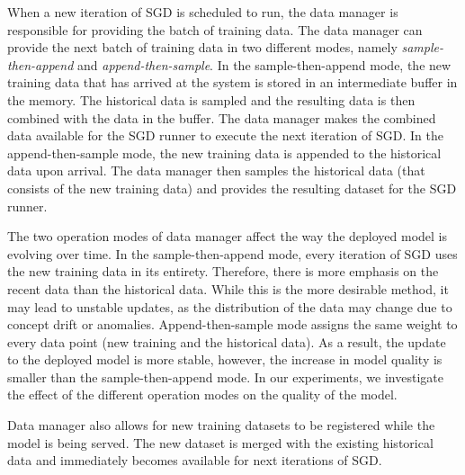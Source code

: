 When a new iteration of SGD is scheduled to run, the data manager is responsible for providing the batch of training data.
The data manager can provide the next batch of training data in two different modes, namely \textit{sample-then-append} and \textit{append-then-sample}.
In the sample-then-append mode, the new training data that has arrived at the system is stored in an intermediate buffer in the memory.
The historical data is sampled and the resulting data is then combined with the data in the buffer.
The data manager makes the combined data available for the SGD runner to execute the next iteration of SGD.
In the append-then-sample mode, the new training data is appended to the historical data upon arrival.
The data manager then samples the historical data (that consists of the new training data) and provides the resulting dataset for the SGD runner.

The two operation modes of data manager affect the way the deployed model is evolving over time.
In the sample-then-append mode, every iteration of SGD uses the new training data in its entirety.
Therefore, there is more emphasis on the recent data than the historical data.
While this is the more desirable method, it may lead to unstable updates, as the distribution of the data may change due to concept drift or anomalies.
Append-then-sample mode assigns the same weight to every data point (new training and the historical data).
As a result, the update to the deployed model is more stable, however, the increase in model quality is smaller than the sample-then-append mode.
In our experiments, we investigate the effect of the different operation modes on the quality of the model.


Data manager also allows for new training datasets to be registered while the model is being served.
The new dataset is merged with the existing historical data and immediately becomes available for next iterations of SGD.

